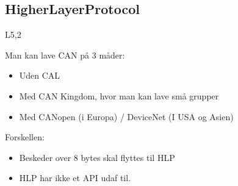 \documentclass[oneside, 10pt]{article}
\begin{document}
\subsection{HigherLayerProtocol}
L5,2


Man kan lave CAN på 3 måder:
\begin{itemize}
	\item Uden CAL
	\item Med CAN Kingdom, hvor man kan lave små grupper
	\item Med CANopen (i Europa) / DeviceNet (I USA og Asien)
\end{itemize}

Forskellen:
\begin{itemize}
	\item Beskeder over 8 bytes skal flyttes til HLP
	\item HLP har ikke et API udaf til.
\end{itemize}
\end{document}
